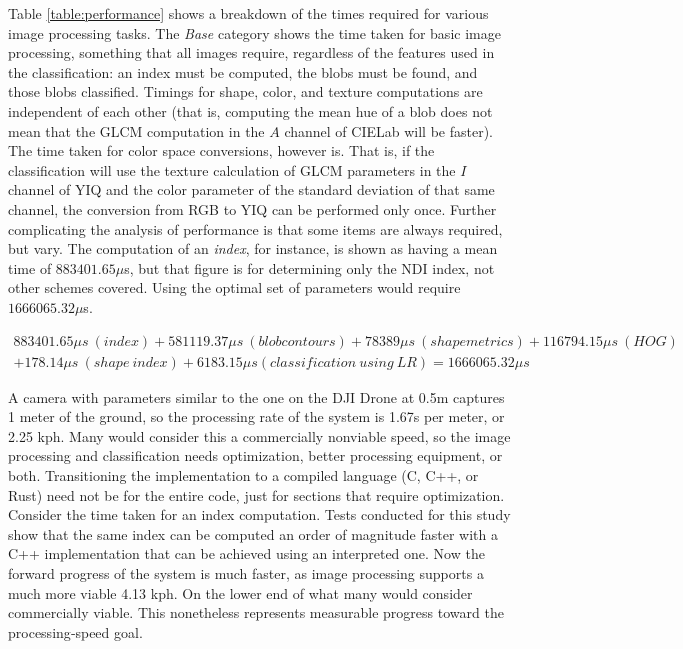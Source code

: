 \documentclass[letterpaper, notitlepage]{report}
\begin{document}
Table \ref{table:performance} shows a breakdown of the times required for various image processing tasks. The \textit{Base} category shows the time taken for basic image processing, something that all images require, regardless of the features used in the classification: an index must be computed, the blobs must be found, and those blobs classified. Timings for shape, color, and texture computations are independent of each other (that is, computing the mean hue of a blob does not mean that the GLCM computation in the $A$ channel of CIELab will be faster). The time taken for color space conversions, however is. That is, if the classification will use the  texture calculation of GLCM parameters in the $I$ channel of YIQ and the color parameter of the standard deviation of that same channel, the conversion from RGB to YIQ can be performed only once. Further complicating the analysis of performance is that some items are always required, but vary. The computation of an \textit{index}, for instance, is shown as having a mean time of $883401.65 \mu$s, but that figure is for determining only the NDI index, not other schemes covered. Using the optimal set of parameters would require $1666065.32 \mu$s. 

\begin{multline}
883401.65 \mu s\ (index) + 581119.37 \mu s\  (blob contours) + 78389 \mu s\ (shape metrics) + 116794.15 \mu s\ (HOG) \\ + 178.14 \mu s\ (shape\ index) + 6183.15 \mu s (classification\ using\ LR) = 1666065.32 \mu s
\end{multline}

A camera with parameters similar to the one on the DJI Drone at 0.5m captures 1 meter of the ground, so the processing rate of the system is 1.67s per meter, or 2.25 kph. Many would consider this a commercially nonviable speed, so the image processing and classification needs optimization, better processing equipment, or both. Transitioning the implementation to a compiled language (C, C++, or Rust) need not be for the entire code, just for sections that require optimization. Consider the time taken for an index computation. Tests conducted for this study show that the same index can be computed an order of magnitude faster with a C++ implementation that can be achieved using an interpreted one. Now the forward progress of the system is much faster, as image processing supports a much more viable 4.13 kph. On the lower end of what many would consider commercially viable. This nonetheless represents measurable progress toward the processing‑speed goal.
\end{document}
